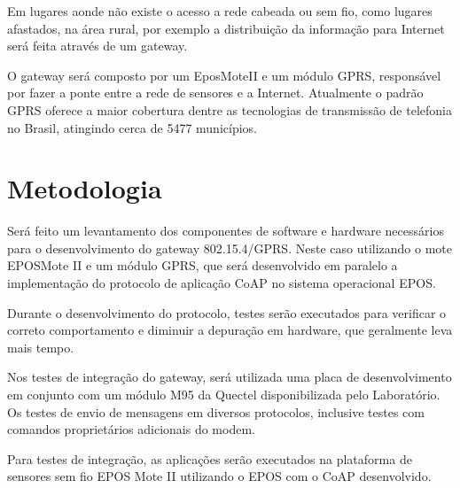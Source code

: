 Em lugares aonde n\~ao existe o acesso a rede cabeada ou sem fio, como lugares afastados, na \'area rural, por exemplo a distribui\c{c}\~ao da informa\c{c}\~ao para Internet ser\'a feita atrav\'es de um gateway.

O gateway ser\'a composto por um EposMoteII e um m\'odulo GPRS, respons\'avel por fazer a ponte entre a rede de sensores e a Internet. Atualmente o padr\~ao GPRS oferece a maior cobertura dentre as tecnologias de transmiss\~ao de telefonia no Brasil, atingindo cerca de 5477 munic\'ipios.\cite{coberturaGPRS}


\section{Metodologia}

Ser\'a feito um levantamento dos componentes de software e hardware necess\'arios para o desenvolvimento do gateway 802.15.4/GPRS. Neste caso utilizando o mote EPOSMote II e um m\'odulo GPRS, que ser\'a desenvolvido em paralelo a implementa\c{c}\~ao do protocolo de aplica\c{c}\~ao CoAP no sistema operacional EPOS.

Durante o desenvolvimento do protocolo, testes ser\~ao executados para verificar o correto comportamento e diminuir a depura\c{c}\~ao em hardware, que geralmente leva mais tempo.

Nos testes de integra\c{c}\~ao do gateway, ser\'a utilizada uma placa de desenvolvimento em conjunto com um m\'odulo M95 da Quectel disponibilizada pelo Laborat\'orio. Os testes de envio de mensagens em diversos protocolos, inclusive testes com comandos propriet\'arios adicionais do modem.

Para testes de integra\c{c}\~ao, as aplica\c{c}\~oes ser\~ao executados na plataforma de sensores sem fio EPOS Mote II utilizando o EPOS com o CoAP desenvolvido.
